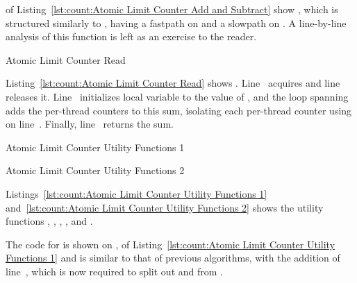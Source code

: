 \begin{lineref}
 of
Listing~\ref{lst:count:Atomic Limit Counter Add and Subtract}
show , which is structured similarly to
, having a fastpath on
 and a slowpath on
.
A line-by-line analysis of this function is left as an exercise to
the reader.
\end{lineref}

\begin{listing}[tbp]

\caption{Atomic Limit Counter Read}
\label{lst:count:Atomic Limit Counter Read}
\end{listing}

\begin{lineref}
Listing~\ref{lst:count:Atomic Limit Counter Read} shows .
Line~ acquires  and
line~ releases it.
Line~ initializes local variable  to the value of
, and the loop spanning
 adds the
per-thread counters to this sum, isolating each per-thread counter
using  on line~.
Finally, line~ returns the sum.
\end{lineref}

\begin{listing}[tbp]

\caption{Atomic Limit Counter Utility Functions 1}
\label{lst:count:Atomic Limit Counter Utility Functions 1}
\end{listing}

\begin{listing}[tb]

\caption{Atomic Limit Counter Utility Functions 2}
\label{lst:count:Atomic Limit Counter Utility Functions 2}
\end{listing}

Listings~\ref{lst:count:Atomic Limit Counter Utility Functions 1}
and~\ref{lst:count:Atomic Limit Counter Utility Functions 2}
shows the utility functions
,
,
,
, and
.
\begin{lineref}
The code for  is shown on
,
of Listing~\ref{lst:count:Atomic Limit Counter Utility Functions 1} and
is similar to that of previous algorithms, with the addition of
line~, which is now required to split out  and
 from .
\end{lineref}


